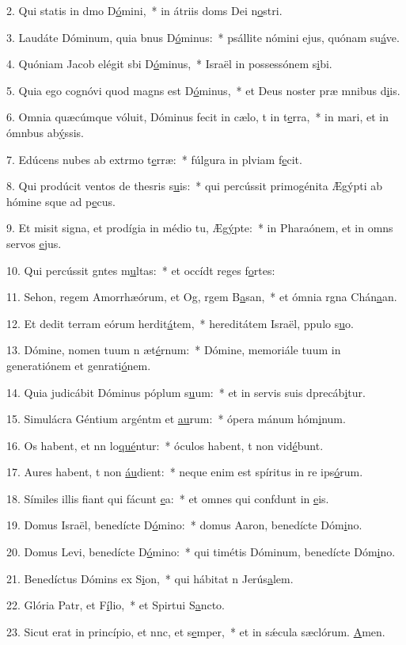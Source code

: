 2. Qui statis in dmo D\uline{ó}mini,~* in átriis doms Dei n\uline{o}stri.\par 
3. Laudáte Dóminum, quia bnus D\uline{ó}minus:~* psállite nómini ejus, quónam su\uline{á}ve.\par 
4. Quóniam Jacob elégit sbi D\uline{ó}minus,~* Israël in possessónem s\uline{i}bi.\par 
5. Quia ego cognóvi quod magns est D\uline{ó}minus,~* et Deus noster præ mnibus d\uline{i}is.\par 
6. Omnia quæcúmque vóluit, Dóminus fecit in cælo, t in t\uline{e}rra,~* in mari, et in ómnbus ab\uline{ý}ssis.\par 
7. Edúcens nubes ab extrmo t\uline{e}rræ:~* fúlgura in plviam f\uline{e}cit.\par 
8. Qui prodúcit ventos de thesris s\uline{u}is:~* qui percússit primogénita Ægýpti ab hómine sque ad p\uline{e}cus.\par 
9. Et misit signa, et prodígia in médio tu, Æg\uline{ý}pte:~* in Pharaónem, et in omns servos \uline{e}jus.\par 
10. Qui percússit gntes m\uline{u}ltas:~* et occídt reges f\uline{o}rtes:\par 
11. Sehon, regem Amorrhæórum, et Og, rgem B\uline{a}san,~* et ómnia rgna Chán\uline{a}an.\par 
12. Et dedit terram eórum herdit\uline{á}tem,~* hereditátem Israël, ppulo s\uline{u}o.\par 
13. Dómine, nomen tuum n æt\uline{é}rnum:~* Dómine, memoriále tuum in generatiónem et genrati\uline{ó}nem.\par 
14. Quia judicábit Dóminus póplum s\uline{u}um:~* et in servis suis dprecáb\uline{i}tur.\par 
15. Simulácra Géntium argéntm et \uline{au}rum:~* ópera mánum hóm\uline{i}num.\par 
16. Os habent, et nn lo\uline{qué}ntur:~* óculos habent, t non vid\uline{é}bunt.\par 
17. Aures habent, t non \uline{áu}dient:~* neque enim est spíritus in re ips\uline{ó}rum.\par 
18. Símiles illis fiant qui fácunt \uline{e}a:~* et omnes qui confdunt in \uline{e}is.\par 
19. Domus Israël, benedícte D\uline{ó}mino:~* domus Aaron, benedícte Dóm\uline{i}no.\par 
20. Domus Levi, benedícte D\uline{ó}mino:~* qui timétis Dóminum, benedícte Dóm\uline{i}no.\par 
21. Benedíctus Dómins ex S\uline{i}on,~* qui hábitat n Jerús\uline{a}lem.\par 
22. Glória Patr, et F\uline{í}lio,~* et Spirtui S\uline{a}ncto.\par 
23. Sicut erat in princípio, et nnc, et s\uline{e}mper,~* et in sǽcula sæclórum. \uline{A}men.\par 
